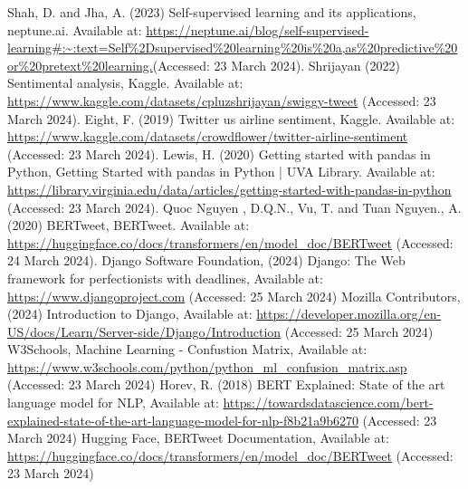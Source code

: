 \documentclass[conference]{IEEEtran}
\begin{document}
\begin{thebibliography}{00}
 Shah, D. and Jha, A. (2023) Self-supervised learning and its applications, neptune.ai. Available at: \url{https://neptune.ai/blog/self-supervised-learning#:~:text=Self%2Dsupervised%20learning%20is%20a,as%20predictive%20or%20pretext%20learning.}(Accessed: 23 March 2024). 
 Shrijayan (2022) Sentimental analysis, Kaggle. Available at: \url{ https://www.kaggle.com/datasets/cpluzshrijayan/swiggy-tweet} (Accessed: 23 March 2024).  
 Eight, F. (2019) Twitter us airline sentiment, Kaggle. Available at: \url{https://www.kaggle.com/datasets/crowdflower/twitter-airline-sentiment} (Accessed: 23 March 2024). 
 Lewis, H. (2020) Getting started with pandas in Python, Getting Started with pandas in Python | UVA Library. Available at: \url{https://library.virginia.edu/data/articles/getting-started-with-pandas-in-python} (Accessed: 23 March 2024). 
 Quoc Nguyen , D.Q.N.,  Vu, T. and Tuan Nguyen., A. (2020) BERTweet, BERTweet. Available at: \url{https://huggingface.co/docs/transformers/en/model_doc/BERTweet} (Accessed: 24 March 2024). 
 Django Software Foundation, (2024) Django: The Web framework for perfectionists with deadlines, Available at: \url{https://www.djangoproject.com} (Accessed: 25 March 2024)
 Mozilla Contributors, (2024) Introduction to Django, Available at: \url{https://developer.mozilla.org/en-US/docs/Learn/Server-side/Django/Introduction} (Accessed: 25 March 2024)
 W3Schools, Machine Learning - Confustion Matrix, Available at: \url{https://www.w3schools.com/python/python_ml_confusion_matrix.asp} (Accessed: 23 March 2024)
 Horev, R. (2018) BERT Explained: State of the art language model for NLP, Available at: \url{https://towardsdatascience.com/bert-explained-state-of-the-art-language-model-for-nlp-f8b21a9b6270} (Accessed: 23 March 2024)
 Hugging Face, BERTweet Documentation, Available at: \url{https://huggingface.co/docs/transformers/en/model_doc/BERTweet} (Accessed: 23 March 2024)
\end{thebibliography}
\vspace{12pt}
\end{document}

